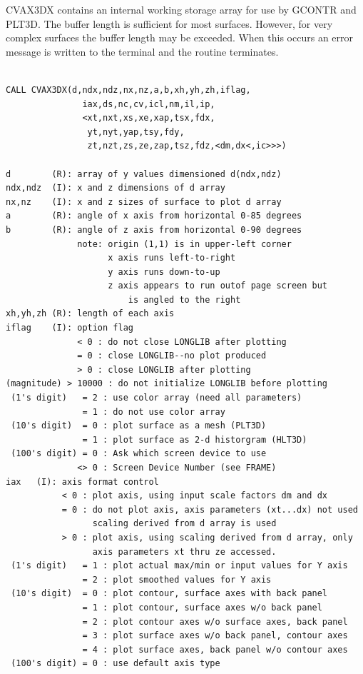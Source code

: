 \documentclass[11pt]{report}
\begin{document}
CVAX3DX contains an internal working storage array for use by GCONTR and
PLT3D.  The buffer length is sufficient for most surfaces.  However, for
very complex surfaces the buffer length may be exceeded.  When this occurs
an error message is written to the terminal and the routine terminates.
\begin{verbatim}

CALL CVAX3DX(d,ndx,ndz,nx,nz,a,b,xh,yh,zh,iflag,
               iax,ds,nc,cv,icl,nm,il,ip,
               <xt,nxt,xs,xe,xap,tsx,fdx,
                yt,nyt,yap,tsy,fdy,
                zt,nzt,zs,ze,zap,tsz,fdz,<dm,dx<,ic>>>)

d        (R): array of y values dimensioned d(ndx,ndz)
ndx,ndz  (I): x and z dimensions of d array
nx,nz    (I): x and z sizes of surface to plot d array
a        (R): angle of x axis from horizontal 0-85 degrees
b        (R): angle of z axis from horizontal 0-90 degrees
              note: origin (1,1) is in upper-left corner
                    x axis runs left-to-right
                    y axis runs down-to-up
                    z axis appears to run outof page screen but
                        is angled to the right
xh,yh,zh (R): length of each axis
iflag    (I): option flag
              < 0 : do not close LONGLIB after plotting
              = 0 : close LONGLIB--no plot produced
              > 0 : close LONGLIB after plotting
(magnitude) > 10000 : do not initialize LONGLIB before plotting
 (1's digit)   = 2 : use color array (need all parameters)
               = 1 : do not use color array
 (10's digit)  = 0 : plot surface as a mesh (PLT3D)
               = 1 : plot surface as 2-d historgram (HLT3D)
 (100's digit) = 0 : Ask which screen device to use
              <> 0 : Screen Device Number (see FRAME)
iax   (I): axis format control
           < 0 : plot axis, using input scale factors dm and dx
           = 0 : do not plot axis, axis parameters (xt...dx) not used
                 scaling derived from d array is used
           > 0 : plot axis, using scaling derived from d array, only
                 axis parameters xt thru ze accessed.
 (1's digit)   = 1 : plot actual max/min or input values for Y axis
               = 2 : plot smoothed values for Y axis
 (10's digit)  = 0 : plot contour, surface axes with back panel
               = 1 : plot contour, surface axes w/o back panel
               = 2 : plot contour axes w/o surface axes, back panel
               = 3 : plot surface axes w/o back panel, contour axes
               = 4 : plot surface axes, back panel w/o contour axes
 (100's digit) = 0 : use default axis type

\end{verbatim}
\end{document}
